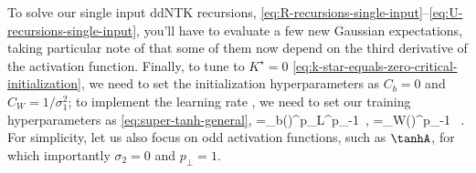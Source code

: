 To solve our single input ddNTK recursions, \eqref{eq:R-recursions-single-input}--\eqref{eq:U-recursions-single-input}, you'll have to evaluate a few new Gaussian expectations, taking particular note of that some of them now depend on the third derivative of the activation function. Finally, to tune to $K^\star=0$   \eqref{eq:k-star-equals-zero-critical-initialization}, we need to set the initialization hyperparameters as $C_b=0$ and $C_W =1/\sigma_1^2$; to implement the learning rate , we need to set our training hyperparameters as
\eqref{eq:super-tanh-general},
\be
\Lb{\ell}=\widetilde{\lambda}_b\le(\ri)^{p_{\perp}}L^{p_{\perp}-1}\, , \qquad \lamW{\ell}=\widetilde{\lambda}_W\le(\ri)^{p_{\perp}-1} \, .
\ee
For simplicity, let us also focus on odd activation functions, such as $\tanhA$, for which importantly $\sigma_2=0$ and $p_\perp = 1$.

